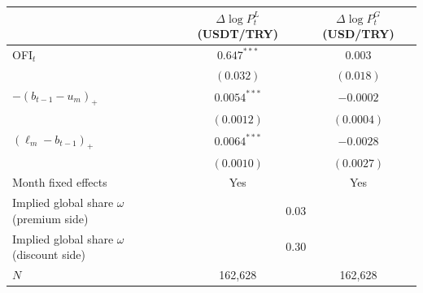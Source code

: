 \begin{tabular}{lcc}
\toprule
 & $\Delta\log P^L_t$ (USDT/TRY) & $\Delta\log P^G_t$ (USD/TRY) \\
\midrule
OFI$_t$ & $0.647^{***}$ & $0.003$ \\
 & $(0.032)$ & $(0.018)$ \\
$-(b_{t-1}-u_m)_+$ & $0.0054^{***}$ & $-0.0002$ \\
 & $(0.0012)$ & $(0.0004)$ \\
$(\ell_m-b_{t-1})_+$ & $0.0064^{***}$ & $-0.0028$ \\
 & $(0.0010)$ & $(0.0027)$ \\
\midrule
Month fixed effects & Yes & Yes \\
Implied global share $\omega$ (premium side) & \multicolumn{2}{c}{0.03} \\
Implied global share $\omega$ (discount side) & \multicolumn{2}{c}{0.30} \\
$N$ & 162,628 & 162,628 \\
\bottomrule
\end{tabular}
